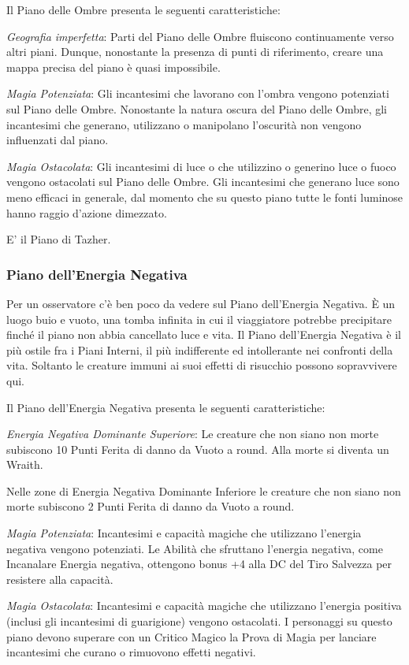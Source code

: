 \documentclass[a4paper,twoside,openany]{book}
\begin{document}
\begin{multicols}{2}
Il Piano delle Ombre presenta le seguenti caratteristiche:

\emph{Geografia imperfetta}: Parti del Piano delle Ombre fluiscono continuamente verso altri piani. Dunque, nonostante la presenza di punti di riferimento, creare una mappa precisa del piano è quasi impossibile.

\emph{Magia Potenziata}: Gli incantesimi che lavorano con l'ombra vengono potenziati sul Piano delle Ombre. Nonostante la natura oscura del Piano delle Ombre, gli incantesimi che generano, utilizzano o manipolano l'oscurità non vengono influenzati dal piano.

\emph{Magia Ostacolata}: Gli incantesimi di luce o che utilizzino o generino luce o fuoco vengono ostacolati sul Piano delle Ombre. Gli incantesimi che generano luce sono meno efficaci in generale, dal momento che su questo piano tutte le fonti luminose hanno raggio d'azione dimezzato.

E' il Piano di Tazher.

\subsubsection{Piano dell'Energia Negativa}\label{pianoenergianegativa}
Per un osservatore c'è ben poco da vedere sul Piano dell'Energia Negativa. È un luogo buio e vuoto, una tomba infinita in cui il viaggiatore potrebbe precipitare finché il piano non abbia cancellato luce e vita. Il Piano dell'Energia Negativa è il più ostile fra i Piani Interni, il più indifferente ed intollerante nei confronti della vita. Soltanto le creature immuni ai suoi effetti di risucchio possono sopravvivere qui.

Il Piano dell'Energia Negativa presenta le seguenti caratteristiche:

\emph{Energia Negativa Dominante Superiore}: Le creature che non siano non morte subiscono 10 Punti Ferita di danno da Vuoto a round. Alla morte si diventa un Wraith.

Nelle zone di Energia Negativa Dominante Inferiore le creature che non siano non morte subiscono 2 Punti Ferita di danno da Vuoto a round.

\emph{Magia Potenziata}: Incantesimi e capacità magiche che utilizzano l'energia negativa vengono potenziati. Le Abilità che sfruttano l'energia negativa, come Incanalare Energia negativa, ottengono bonus +4 alla DC del Tiro Salvezza per resistere alla capacità.

\emph{Magia Ostacolata}: Incantesimi e capacità magiche che utilizzano l'energia positiva (inclusi gli incantesimi di guarigione) vengono ostacolati. I personaggi su questo piano devono superare con un Critico Magico la Prova di Magia per lanciare incantesimi che curano o rimuovono effetti negativi.


\end{multicols}
\end{document}
